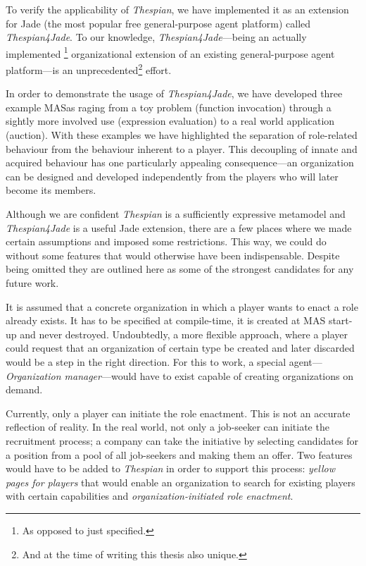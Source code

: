 To verify the applicability of \textit{Thespian}, we have implemented it as an extension for Jade (the most popular free general-purpose agent platform) called \textit{Thespian4Jade}.
To our knowledge, \textit{Thespian4Jade}---being an actually implemented \footnote{As opposed to just specified.} organizational extension of an existing general-purpose agent platform---is an unprecedented\footnote{And at the time of writing this thesis also unique.} effort.

In order to demonstrate the usage of \textit{Thespian4Jade}, we have developed three example MASas raging from a toy problem (function invocation) through a sightly more involved use (expression evaluation) to a real world application (auction).
With these examples we have highlighted the separation of role-related behaviour from the behaviour inherent to a player.
This decoupling of innate and acquired behaviour has one particularly appealing consequence---an organization can be designed and developed independently from the players who will later become its members. 


Although we are confident \textit{Thespian} is a sufficiently expressive metamodel and \textit{Thespian4Jade} is a useful Jade extension, there are a few places where we made certain assumptions and imposed some restrictions.
This way, we could do without some features that would otherwise have been indispensable.
Despite being omitted they are outlined here as some of the strongest candidates for any future work.

It is assumed that a concrete organization in which a player wants to enact a role already exists.
It has to be specified at compile-time, it is created at MAS start-up and never destroyed.
Undoubtedly, a more flexible approach, where a player could request that an organization of certain type be created and later discarded would be a step in the right direction.
For this to work, a special agent---\textit{Organization manager}---would have to exist capable of creating organizations on demand.

Currently, only a player can initiate the role enactment.
This is not an accurate reflection of reality.
In the real world, not only a job-seeker can initiate the recruitment process; a company can take the initiative by selecting candidates for a position from a pool of all job-seekers and making them an offer.
Two features would have to be added to \textit{Thespian} in order to support this process: \textit{yellow pages for players} that would enable an organization to search for existing players with certain capabilities and \textit{organization-initiated role enactment}.

